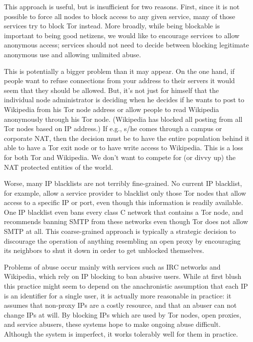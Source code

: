\documentclass{llncs}
\begin{document}
This approach is useful, but is insufficient for two reasons.  First, since
it is not possible to force all nodes to block access to any given service,
many of those services try to block Tor instead.  More broadly, while being
blockable is important to being good netizens, we would like to encourage
services to allow anonymous access; services should not need to decide
between blocking legitimate anonymous use and allowing unlimited abuse.

This is potentially a bigger problem than it may appear. 
On the one hand, if people want to refuse connections from your address to
their servers it would seem that they should be allowed.  But, it's not just
for himself that the individual node administrator is deciding when he decides
if he wants to post to Wikipedia from his Tor node address or allow
people to read Wikipedia anonymously through his Tor node. (Wikipedia
has blocked all posting from all Tor nodes based on IP address.) If e.g.,
s/he comes through a campus or corporate NAT, then the decision must
be to have the entire population behind it able to have a Tor exit
node or to have write access to Wikipedia. This is a loss for both Tor
and Wikipedia. We don't want to compete for (or divvy up) the NAT
protected entities of the world.

Worse, many IP blacklists are not terribly fine-grained.
No current IP blacklist, for example, allow a service provider to blacklist
only those Tor nodes that allow access to a specific IP or port, even
though this information is readily available.  One IP blacklist even bans
every class C network that contains a Tor node, and recommends banning SMTP
from these networks even though Tor does not allow SMTP at all.  This
coarse-grained approach is typically a strategic decision to discourage the
operation of anything resembling an open proxy by encouraging its neighbors
to shut it down in order to get unblocked themselves.

Problems of abuse occur mainly with services such as IRC networks and
Wikipedia, which rely on IP blocking to ban abusive users.  While at first
blush this practice might seem to depend on the anachronistic assumption that
each IP is an identifier for a single user, it is actually more reasonable in
practice: it assumes that non-proxy IPs are a costly resource, and that an
abuser can not change IPs at will.  By blocking IPs which are used by Tor
nodes, open proxies, and service abusers, these systems hope to make
ongoing abuse difficult.  Although the system is imperfect, it works
tolerably well for them in practice.
\end{document}
